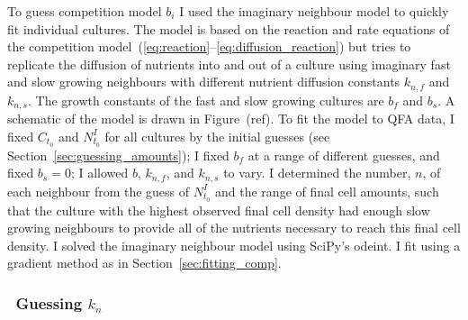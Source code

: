 To guess competition model \(b_{i}\) I used the imaginary neighbour
model to quickly fit individual cultures. The model is based on the
reaction and rate equations of the competition
model~(\ref{eq:reaction}--\ref{eq:diffusion_reaction}) but tries to
replicate the diffusion of nutrients into and out of a culture using
imaginary fast and slow growing neighbours with different nutrient
diffusion constants \(k_{n,f}\) and \(k_{n,s}\). The growth constants
of the fast and slow growing cultures are \(b_{f}\) and \(b_{s}\). A
schematic of the model is drawn in Figure~(ref). To fit the model to
QFA data, I fixed \(C_{t_{0}}\) and \(N^{I}_{t_{0}}\) for all cultures
by the initial guesses (see Section~\ref{sec:guessing_amounts}); I
fixed \(b_{f}\) at a range of different guesses, and fixed
\(b_{s} = 0\); I allowed \(b\), \(k_{n,f}\), and \(k_{n,s}\) to
vary. I determined the number, \(n\), of each neighbour from the guess
of \(N^{I}_{t_{0}}\) and the range of final cell amounts, such that
the culture with the highest observed final cell density had enough
slow growing neighbours to provide all of the nutrients necessary to
reach this final cell density. I solved the imaginary neighbour model
using SciPy's odeint. I fit using a gradient method as in
Section~\ref{sec:fitting_comp}.


\subsubsection{\boldmath \thesubsubsection~Guessing \({k_{n}}\) \unboldmath}

